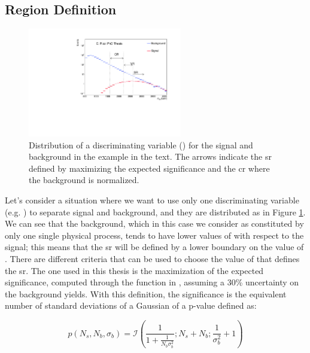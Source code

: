 \subsection{Region Definition}
\label{sec:example_sr}

\begin{figure}[h]
\centering 
\includegraphics[width=0.6\textwidth]{produce_plots/stat/sig_bkg_CR.pdf}
\caption{Distribution of a discriminating variable (\meff) for the signal and background in the example in the text. 
The arrows indicate the \gls{sr} defined by maximizing the expected significance and the \gls{cr} where the background is normalized. 
}
\label{fig:stat:example}
\end{figure}

Let's consider a situation where we want to use only one discriminating variable (e.g. \meff) to separate signal and background, 
and they are distributed as in Figure \ref{fig:stat:example}. 
We can see that the background, which in this case we consider as constituted by only one single physical process, 
tends to have lower values of \meff with respect to the signal; 
this means that the \gls{sr} will be defined by a lower boundary on the value of \meff.
There are different criteria that can be used to choose the value of \meff that defines the \gls{sr}. 
The one used in this thesis is the maximization of the expected significance, computed through the function \binexpZ in \roostats, 
assuming a 30\% uncertainty on the background yields. With this definition, the significance is the equivalent number of standard deviations of a Gaussian of a p-value defined as:

\begin{equation}
\label{eq:binomexpp}
p(N_s, N_b, \sigma_b) = \mathcal{I} \left( \frac{1}{1+ \frac{1}{N_b \sigma_b^2}}; N_s + N_b; \frac{1}{\sigma_b^2} +1  \right)
\end{equation}

